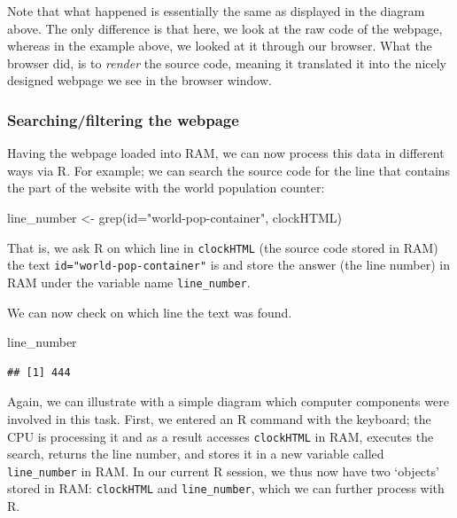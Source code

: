 \documentclass[
  12pt,
]{style/krantz}
\newenvironment{Shaded}{\begin{snugshade}}{\end{snugshade}}
\newcommand{\FunctionTok}[1]{\textcolor[rgb]{0.00,0.00,0.00}{#1}}
\newcommand{\NormalTok}[1]{#1}
\newcommand{\OtherTok}[1]{\textcolor[rgb]{0.56,0.35,0.01}{#1}}
\newcommand{\StringTok}[1]{\textcolor[rgb]{0.31,0.60,0.02}{#1}}
\begin{document}
Note that what happened is essentially the same as displayed in the diagram above. The only difference is that here, we look at the raw code of the webpage, whereas in the example above, we looked at it through our browser. What the browser did, is to \emph{render} the source code, meaning it translated it into the nicely designed webpage we see in the browser window.

\hypertarget{searchingfiltering-the-webpage}{%
\subsubsection{Searching/filtering the webpage}\label{searchingfiltering-the-webpage}}

Having the webpage loaded into RAM, we can now process this data in different ways via R. For example; we can search the source code for the line that contains the part of the website with the world population counter:

\begin{Shaded}
\begin{Highlighting}[]
\NormalTok{line\_number }\OtherTok{\textless{}{-}} \FunctionTok{grep}\NormalTok{(}\StringTok{\textquotesingle{}id="world{-}pop{-}container"\textquotesingle{}}\NormalTok{, clockHTML)}
\end{Highlighting}
\end{Shaded}

That is, we ask R on which line in \texttt{clockHTML} (the source code stored in RAM) the text \texttt{id="world-pop-container"} is and store the answer (the line number) in RAM under the variable name \texttt{line\_number}.

We can now check on which line the text was found.

\begin{Shaded}
\begin{Highlighting}[]
\NormalTok{line\_number}
\end{Highlighting}
\end{Shaded}

\begin{verbatim}
## [1] 444
\end{verbatim}

Again, we can illustrate with a simple diagram which computer components were involved in this task. First, we entered an R command with the keyboard; the CPU is processing it and as a result accesses \texttt{clockHTML} in RAM, executes the search, returns the line number, and stores it in a new variable called \texttt{line\_number} in RAM. In our current R session, we thus now have two `objects' stored in RAM: \texttt{clockHTML} and \texttt{line\_number}, which we can further process with R.
\end{document}
